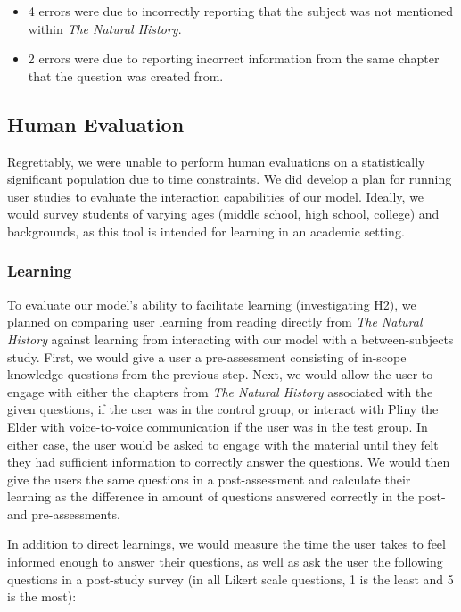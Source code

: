 \documentclass[sigconf]{aamas}
\begin{document}
\begin{itemize}
    \item 4 errors were due to incorrectly reporting that the subject was not mentioned within \textit{The Natural History}.
    \item 2 errors were due to reporting incorrect information from the same chapter that the question was created from.
\end{itemize}

\subsection{Human Evaluation}

Regrettably, we were unable to perform human evaluations on a statistically significant population due to time constraints. We did develop a plan for running user studies to evaluate the interaction capabilities of our model. Ideally, we would survey students of varying ages (middle school, high school, college) and backgrounds, as this tool is intended for learning in an academic setting.

\subsubsection{Learning}

To evaluate our model's ability to facilitate learning (investigating H2), we planned on comparing user learning from reading directly from \textit{The Natural History} against learning from interacting with our model with a between-subjects study. First, we would give a user a pre-assessment consisting of in-scope knowledge questions from the previous step. Next, we would allow the user to engage with either the chapters from \textit{The Natural History} associated with the given questions, if the user was in the control group, or interact with Pliny the Elder with voice-to-voice communication if the user was in the test group. In either case, the user would be asked to engage with the material until they felt they had sufficient information to correctly answer the questions. We would then give the users the same questions in a post-assessment and calculate their learning as the difference in amount of questions answered correctly in the post- and pre-assessments.

In addition to direct learnings, we would measure the time the user takes to feel informed enough to answer their questions, as well as ask the user the following questions in a post-study survey (in all Likert scale questions, 1 is the least and 5 is the most):
\end{document}
